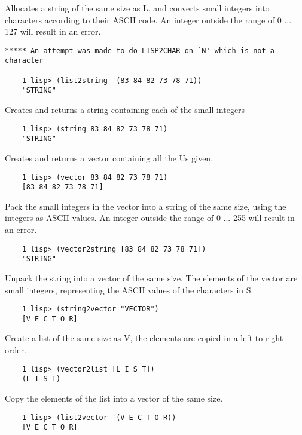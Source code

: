 {    Allocates a string of the same size as L, and converts small
    integers into characters according to their ASCII code.   An
    integer  outside  the  range  of 0 ... 127 will result in an
    error.
}
\begin{verbatim}
***** An attempt was made to do LISP2CHAR on `N' which is not a character

    1 lisp> (list2string '(83 84 82 73 78 71))
    "STRING"
\end{verbatim}
{    Creates  and  returns  a string containing each of the small
    integers
}
\begin{verbatim}
    1 lisp> (string 83 84 82 73 78 71)
    "STRING"
\end{verbatim}
{    Creates and returns a vector containing all the Us given.
}
\begin{verbatim}
    1 lisp> (vector 83 84 82 73 78 71)
    [83 84 82 73 78 71]
\end{verbatim}
{    Pack the small integers in the vector into a string  of  the
    same  size,  using the integers as ASCII values.  An integer
    outside the range of 0 ... 255 will result in an error.
}
\begin{verbatim}
    1 lisp> (vector2string [83 84 82 73 78 71])
    "STRING"
\end{verbatim}
{    Unpack the string into a vector  of  the  same  size.    The
    elements  of the vector are small integers, representing the
    ASCII values of the characters in S.
}
\begin{verbatim}
    1 lisp> (string2vector "VECTOR")
    [V E C T O R]
\end{verbatim}
{    Create a list of the same size as V, the elements are copied
    in a left to right order.
}
\begin{verbatim}
    1 lisp> (vector2list [L I S T])
    (L I S T)
\end{verbatim}
{    Copy the elements of the list into  a  vector  of  the  same
    size.
}
\begin{verbatim}
    1 lisp> (list2vector '(V E C T O R))
    [V E C T O R]
\end{verbatim}
